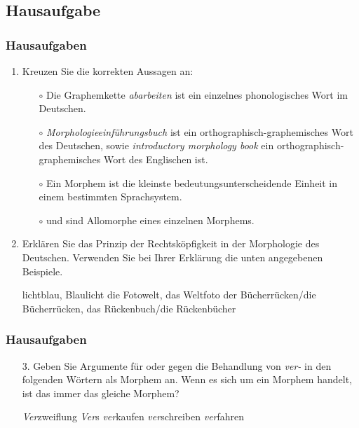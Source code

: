\subsection{Hausaufgabe}

\begin{frame}
\frametitle{Hausaufgaben}


\begin{enumerate}
	\item Kreuzen Sie die korrekten Aussagen an: %
	
	\begin{itemize}
		\item[$\circ$] Die Graphemkette \emph{abarbeiten} ist ein einzelnes phonologisches Wort im Deutschen.
		\item[$\circ$] \emph{Morphologieeinführungsbuch} ist ein orthographisch-graphemisches Wort des Deutschen, sowie \emph{introductory morphology book} ein orthographisch-graphemisches Wort des Englischen ist.
		\item[$\circ$] Ein Morphem ist die kleinste bedeutungsunterscheidende Einheit in einem bestimmten Sprachsystem.
		\item[$\circ$]  und  sind Allomorphe eines einzelnen Morphems.
	\end{itemize}
	
	\item Erklären Sie das Prinzip der Rechtsköpfigkeit in der Morphologie des Deutschen. Verwenden Sie bei Ihrer Erklärung die unten angegebenen Beispiele. %
	
	\eal\label{ex:05cHA2}
	\ex\label{ex:05cHA2a} lichtblau, Blaulicht
	\ex\label{ex:05cHA2b} die Fotowelt, das Weltfoto
	\ex\label{ex:05cHA2c} der Bücherrücken/die Bücherrücken, das Rückenbuch/die Rückenbücher
	\zl
\end{enumerate}

\end{frame}


\begin{frame}
\frametitle{Hausaufgaben}

\begin{itemize}
\item[3.] Geben Sie Argumente für oder gegen die Behandlung von \emph{ver-} in den folgenden Wörtern als Morphem an. Wenn es sich um ein Morphem handelt, ist das immer das gleiche Morphem? %

\eal\label{ex:05cHA3}
\ex\label{ex:05cHA3a} \emph{Ver}zweiflung
\ex\label{ex:05cHA3b} \emph{Ver}s
\ex\label{ex:05cHA3c} \emph{ver}kaufen
\ex\label{ex:05cHA3d} \emph{ver}schreiben
\ex\label{ex:05cHA3e} \emph{ver}fahren
\zl

\end{itemize}
\end{frame}


